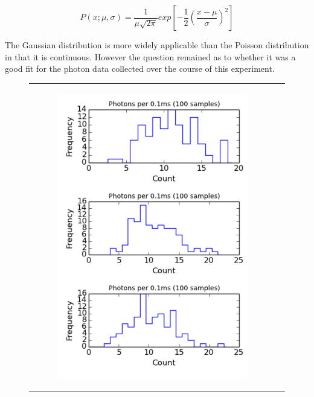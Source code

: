 \documentclass[a4paper,12pt]{article}
\begin{document}
\begin{equation}
\label{eqn:gaussian}
P(x;\mu,\sigma) = \frac{1}{\mu\sqrt{2\pi}}exp[-\frac{1}{2}(\frac{x-\mu}{\sigma})^2]
\end{equation}

The Gaussian distribution is more widely applicable than the Poisson distribution in that it is continuous. However the question remained as to whether it was a good fit for the photon data collected over the course of this experiment.

\begin{figure}[ht]
\begin{tabular}{c|c}
\centering
\begin{subfigure}{0.5\textwidth}
  \centering
  \hspace{-0.3in}
  \includegraphics[width=\linewidth]{section5_crop.pdf}

\end{subfigure}
\end{tabular}
\end{figure}
\end{document}

